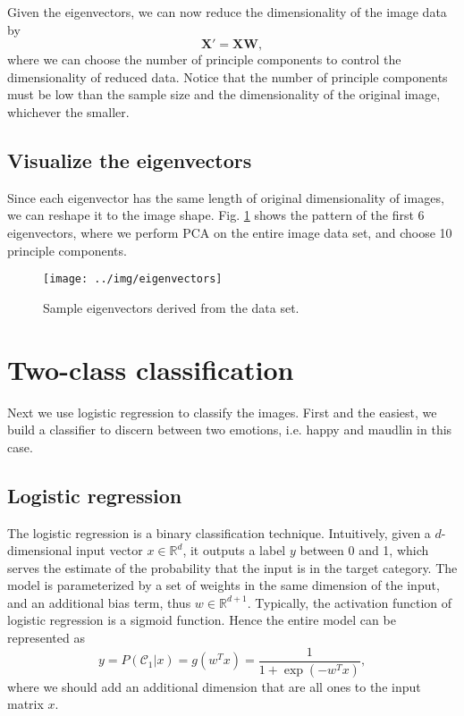 \documentclass{article} %
\begin{document}
Given the eigenvectors, we can now reduce the dimensionality of the image data by
\begin{equation}
	\boldsymbol{X'} = \boldsymbol{X}\boldsymbol{W},
\end{equation}
where we can choose the number of principle components to control the dimensionality of reduced data. Notice that the number of principle components must be low than the sample size and the dimensionality of the original image, whichever the smaller.

\subsection{Visualize the eigenvectors}
Since each eigenvector has the same length of original dimensionality of images, we can reshape it to the image shape. Fig. \ref{fig:eigen} shows the pattern of the first 6 eigenvectors, where we perform PCA on the entire image data set, and choose 10 principle components.


\begin{figure}[h]
\centering
\texttt{[image: ../img/eigenvectors]}
\caption{Sample eigenvectors derived from the data set.}
\label{fig:eigen}
\end{figure}

\section{Two-class classification}
Next we use logistic regression to classify the images. First and the easiest, we build a classifier to discern between two emotions, i.e. happy and maudlin in this case.

\subsection{Logistic regression}
The logistic regression is a binary classification technique. Intuitively, given a $d$-dimensional input vector $x\in \mathbb{R}^d$, it outputs a label $y$ between 0 and 1, which serves the estimate of the probability that the input is in the target category. The model is parameterized by a set of weights in the same dimension of the input, and an additional bias term, thus $w \in \mathbb{R}^{d+1}$. Typically, the activation function of logistic regression is a sigmoid function. Hence the entire model can be represented as
\begin{equation}
	y = P(\mathcal{C}_1|x) = g(w^Tx) = \frac{1}{1+\exp(-w^Tx)},
\end{equation}
where we should add an additional dimension that are all ones to the input matrix $x$.
\end{document}

